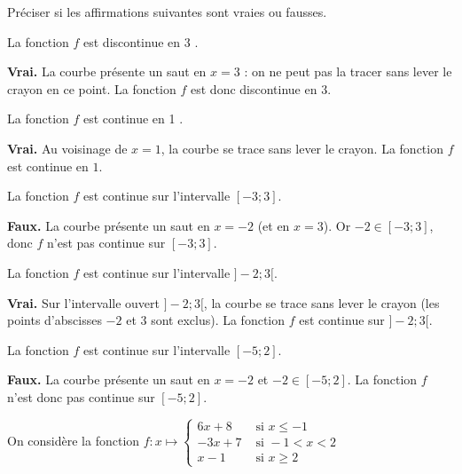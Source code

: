 \documentclass[11pt,a4paper]{article}  %
\begin{document}
	Préciser si les affirmations suivantes sont vraies ou fausses.
	\begin{enumMet}
		\item La fonction $f$ est discontinue en 3 .
		
		\begin{corrBox}
			\textbf{Vrai.} La courbe présente un \og saut \fg{} en $x=3$ : on ne peut pas la tracer sans lever le crayon en ce point. La fonction $f$ est donc discontinue en $3$.
		\end{corrBox}
		
		\item La fonction $f$ est continue en 1 .
		
		\begin{corrBox}
			\textbf{Vrai.} Au voisinage de $x=1$, la courbe se trace sans lever le crayon. La fonction $f$ est continue en $1$.
		\end{corrBox}
		
		\item La fonction $f$ est continue sur l'intervalle $[-3 ; 3]$.
		
		\begin{corrBox}
			\textbf{Faux.} La courbe présente un saut en $x=-2$ (et en $x=3$). Or $-2\in[-3;3]$, donc $f$ n'est pas continue sur $[-3;3]$.
		\end{corrBox}
		
		\item La fonction $f$ est continue sur l'intervalle $]-2 ; 3[$.
		
		\begin{corrBox}
			\textbf{Vrai.} Sur l'intervalle ouvert $]-2;3[$, la courbe se trace sans lever le crayon (les points d'abscisses $-2$ et $3$ sont exclus). La fonction $f$ est continue sur $]-2;3[$.
		\end{corrBox}
		
		\item La fonction $f$ est continue sur l'intervalle $[-5 ; 2]$.
		
		\begin{corrBox}
			\textbf{Faux.} La courbe présente un saut en $x=-2$ et $-2\in[-5;2]$. La fonction $f$ n'est donc pas continue sur $[-5;2]$.
		\end{corrBox}
	\end{enumMet}
	
	\exerciceDS{}
	
	On considère la fonction $f: x \mapsto \begin{cases}6 x+8 & \text { si } x \leqslant-1 \\ -3 x+7 & \text { si }-1<x<2  \\ x-1 & \text { si } x \geqslant 2\end{cases}$
	
\end{document}
